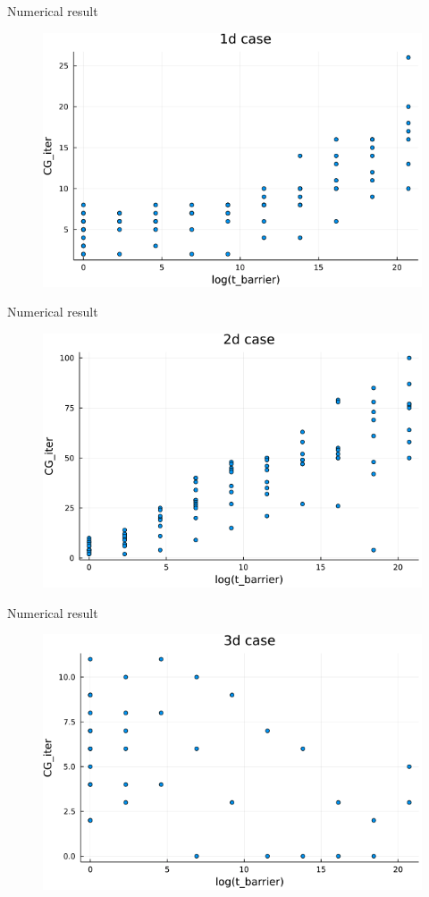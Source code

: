 \documentclass{beamer}
\begin{document}
\begin{frame}{Numerical result}
\begin{figure}
    \centering
    \includegraphics[width=0.6\linewidth]{Interior Point Method/1d_missing.png}
\end{figure}
\end{frame}

\begin{frame}{Numerical result}
\begin{figure}
    \centering
    \includegraphics[width=0.6\linewidth]{Interior Point Method/2d_missing.png}
\end{figure}
\end{frame}

\begin{frame}{Numerical result}
\begin{figure}
    \centering
    \includegraphics[width=0.6\linewidth]{Interior Point Method/3d_missing.png}
\end{figure}
\end{frame}
\end{document}
